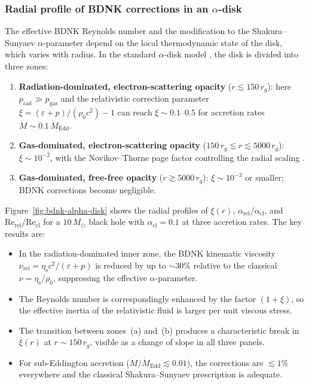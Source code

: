 \subsubsection{Radial profile of BDNK corrections in an $\alpha$-disk}

The effective BDNK Reynolds number and the modification to the
Shakura--Sunyaev $\alpha$-parameter depend on the local thermodynamic
state of the disk, which varies with radius.  In the standard
$\alpha$-disk model \citep{ShakuraSunyaev1973}, the disk is divided
into three zones:
\begin{enumerate}
\item[(a)] \textbf{Radiation-dominated, electron-scattering opacity}
  ($r\lesssim 150\,r_{g}$): here $p_{\mathrm{rad}}\gg p_{\mathrm{gas}}$
  and the relativistic correction parameter
  $\xi=(\varepsilon+p)/(\rho_{0}c^{2})-1$ can reach $\xi\sim 0.1$--$0.5$
  for accretion rates $\dot{M}\sim 0.1\,\dot{M}_{\mathrm{Edd}}$.
\item[(b)] \textbf{Gas-dominated, electron-scattering opacity}
  ($150\,r_{g}\lesssim r\lesssim 5000\,r_{g}$): $\xi\sim 10^{-2}$,
  with the Novikov--Thorne page factor controlling the radial
  scaling \citep{NovikovThorne1973}.
\item[(c)] \textbf{Gas-dominated, free-free opacity}
  ($r\gtrsim 5000\,r_{g}$): $\xi\sim 10^{-3}$ or smaller; BDNK
  corrections become negligible.
\end{enumerate}

Figure~\ref{fig:bdnk-alpha-disk} shows the radial profiles of $\xi(r)$,
$\alpha_{\mathrm{rel}}/\alpha_{\mathrm{cl}}$, and
$\mathrm{Re}_{\mathrm{rel}}/\mathrm{Re}_{\mathrm{cl}}$ for a
$10\,M_{\odot}$ black hole with $\alpha_{\mathrm{cl}}=0.1$ at three
accretion rates.  The key results are:
\begin{itemize}
\item In the radiation-dominated inner zone, the BDNK kinematic
  viscosity $\nu_{\mathrm{rel}}=\eta_{\mathrm{s}}c^{2}/(\varepsilon+p)$
  is reduced by up to $\sim 30\%$ relative to the classical
  $\nu=\eta_{\mathrm{s}}/\rho_{0}$, suppressing the effective
  $\alpha$-parameter.
\item The Reynolds number is correspondingly enhanced by the
  factor $(1+\xi)$, so the effective inertia of the relativistic
  fluid is larger per unit viscous stress.
\item The transition between zones~(a) and~(b) produces a
  characteristic break in $\xi(r)$ at $r\sim 150\,r_{g}$, visible
  as a change of slope in all three panels.
\item For sub-Eddington accretion ($\dot{M}/\dot{M}_{\mathrm{Edd}}
  \lesssim 0.01$), the corrections are $\lesssim 1\%$ everywhere
  and the classical Shakura--Sunyaev prescription is adequate.
\end{itemize}

